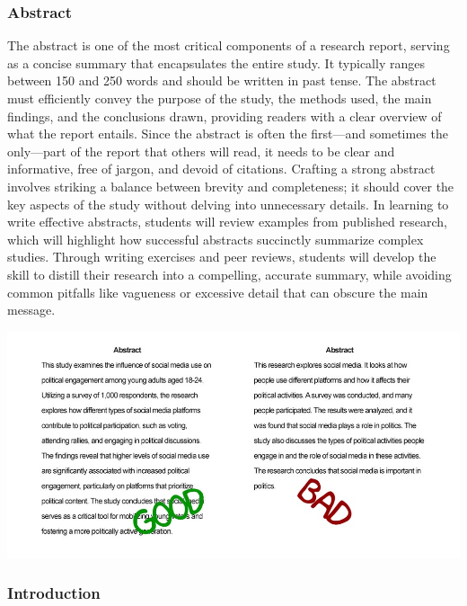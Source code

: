 \documentclass[
]{book}
\begin{document}
\subsubsection*{Abstract}\label{abstract}

The abstract is one of the most critical components of a research report, serving as a concise summary that encapsulates the entire study. It typically ranges between 150 and 250 words and should be written in past tense. The abstract must efficiently convey the purpose of the study, the methods used, the main findings, and the conclusions drawn, providing readers with a clear overview of what the report entails. Since the abstract is often the first---and sometimes the only---part of the report that others will read, it needs to be clear and informative, free of jargon, and devoid of citations. Crafting a strong abstract involves striking a balance between brevity and completeness; it should cover the key aspects of the study without delving into unnecessary details. In learning to write effective abstracts, students will review examples from published research, which will highlight how successful abstracts succinctly summarize complex studies. Through writing exercises and peer reviews, students will develop the skill to distill their research into a compelling, accurate summary, while avoiding common pitfalls like vagueness or excessive detail that can obscure the main message.

\includegraphics[width=1\linewidth,height=\textheight,keepaspectratio]{images/fig081.jpg}

\subsubsection*{Introduction}\label{introduction}
\end{document}
